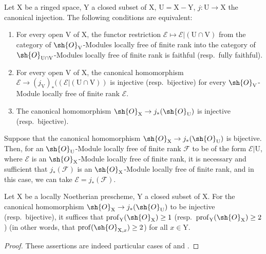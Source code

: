 \begin{corollary}[21.13.3]
\label{IV.21.13.3}
Let $\mathrm{X}$ be a ringed space, $\mathrm{Y}$ a closed subset of $\mathrm{X}$, $\mathrm{U}=\mathrm{X}-\mathrm{Y}$, $j:\mathrm{U}\to\mathrm{X}$ the canonical injection.
The following conditions are equivalent:
\begin{enumerate}[label=\emph{\alph*)}]
  \item For every open $\mathrm{V}$ of $\mathrm{X}$, the functor restriction $\mathscr{E}\mapsto\mathscr{E}|(\mathrm{U}\cap\mathrm{V})$ from the category of $\sh{O}_{\mathrm{V}}$-Modules locally free of finite rank into the category of $\sh{O}_{\mathrm{U}\cap\mathrm{V}}$-Modules locally free of finite rank is faithful (resp.\ fully faithful).
  \item For every open $\mathrm{V}$ of $\mathrm{X}$, the canonical homomorphism $\mathscr{E}\to(j_{\mathrm{V}})_*((\mathscr{E}|(\mathrm{U}\cap\mathrm{V}))$ is injective (resp.\ bijective) for every $\sh{O}_{\mathrm{V}}$-Module locally free of finite rank $\mathscr{E}$.
  \item[\emph{b')}] The canonical homomorphism $\sh{O}_{\mathrm{X}}\to j_*(\sh{O}_{\mathrm{U}})$ is injective (resp.\ bijective).
\end{enumerate}

Suppose that the canonical homomorphism $\sh{O}_{\mathrm{X}}\to j_*(\sh{O}_{\mathrm{U}})$ is bijective.
Then, for an $\sh{O}_{\mathrm{U}}$-Module locally free of finite rank $\mathscr{F}$ to be of the form $\mathscr{E}|\mathrm{U}$, where $\mathscr{E}$ is an $\sh{O}_{\mathrm{X}}$-Module locally free of finite rank, it is necessary and sufficient that $j_*(\mathscr{F})$ is an $\sh{O}_{\mathrm{X}}$-Module locally free of finite rank, and in this case, we can take $\mathscr{E}=j_*(\mathscr{F})$.
\end{corollary}

\begin{lemma}[21.13.4]
\label{IV.21.13.4}
Let $\mathrm{X}$ be a locally Noetherian prescheme, $\mathrm{Y}$ a closed subset of $\mathrm{X}$.
For the canonical homomorphism $\sh{O}_{\mathrm{X}}\to j_*(\sh{O}_{\mathrm{U}})$ to be injective (resp.\ bijective), it suffices that $\operatorname{prof}_{\mathrm{Y}}(\sh{O}_{\mathrm{X}})\geq 1$ (resp.\ $\operatorname{prof}_{\mathrm{Y}}(\sh{O}_{\mathrm{X}})\geq 2$) (in other words, that $\operatorname{prof}(\sh{O}_{\mathrm{X},x})\geq 2$) for all $x\in\mathrm{Y}$.
\end{lemma}

\begin{proof}
These assertions are indeed particular cases of  and .
\end{proof}


